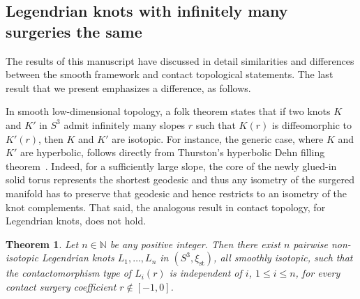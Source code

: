 \documentclass[11pt]{amsart} %
\newcommand{\N}{\mathbb{N}}
\newcommand{\xist}{\xi_{\mathrm{st}}}
\theoremstyle{plain}
\newtheorem{thm}[Theorem]{Theorem}
\theoremstyle{definition}
\begin{document}
\subsection{Legendrian knots with infinitely many surgeries the same} The results of this manuscript have discussed in detail similarities and differences between the smooth framework and contact topological statements. The last result that we present emphasizes a difference, as follows.

In smooth low-dimensional topology, a folk theorem states that if two knots $K$ and $K'$ in $S^3$ admit infinitely many slopes $r$ such that $K(r)$ is diffeomorphic to $K'(r)$, then $K$ and $K'$ are isotopic. For instance, the generic case, where $K$ and $K'$ are hyperbolic, follows directly from Thurston's hyperbolic Dehn filling theorem~\cite{Thurston80}. Indeed, for a sufficiently large slope, the core of the newly glued-in solid torus represents the shortest geodesic and thus any isometry of the surgered manifold has to preserve that geodesic and hence restricts to an isometry of the knot complements. That said, the analogous result in contact topology, for Legendrian knots, does not hold.

\begin{thm}
	Let $n\in\N$ be any positive integer. Then there exist $n$ pairwise non-isotopic Legendrian knots $L_1,\ldots, L_n$ in $(S^3,\xist)$, all smoothly isotopic, such that the contactomorphism type of $L_i(r)$ is independent of $i$, $1\leq i\leq n$, for every contact surgery coefficient $r\not\in [-1,0]$.
\end{thm}
\end{document}
